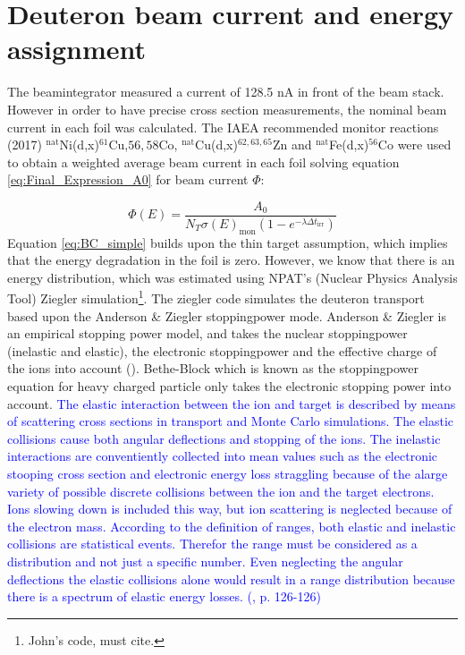 \section{Deuteron beam current and energy assignment} \label{sec:beamcurrent}
The beamintegrator measured a current of 128.5 nA in front of the beam stack. However in order to have precise cross section measurements, the nominal beam current in each foil was calculated. The IAEA recommended monitor reactions (2017) $^\text{nat}$Ni(d,x)$^{61}$Cu,$56,58$Co, $^\text{nat}$Cu(d,x)$^{62,63,65}$Zn and $^\text{nat}$Fe(d,x)$^{56}$Co \cite{Hermanne2018a} were used to obtain a weighted average beam current in each foil solving equation \ref{eq:Final_Expression_A0} for beam current $\Phi$:

\begin{equation} \label{eq:BC_simple}
    \Phi(E) = \frac{A_0}{N_T \sigma(E)_\text{mon}(1-e^{-\lambda \Delta t_\text{irr}})}
\end{equation}
\noindent 
Equation \ref{eq:BC_simple} builds upon the thin target assumption, which implies that the energy degradation in the foil is zero. However, we know that there is an energy distribution, which was estimated using NPAT's (Nuclear Physics Analysis Tool) Ziegler simulation\footnote{John's code, must cite.}. The ziegler code simulates the deuteron transport based upon the Anderson \& Ziegler stoppingpower mode\cite{Ziegler1999}. Anderson \& Ziegler is an empirical stopping power model, and takes the nuclear stoppingpower (inelastic and elastic), the electronic stoppingpower and the effective charge of the ions into account (\cite{Backlin1986, p. 96}). Bethe-Block which is known as the stoppingpower equation for heavy charged particle only takes the electronic stopping power into account. \textcolor{blue}{The elastic interaction between the ion and target is described by means of scattering cross sections in transport and Monte Carlo simulations. The elastic collisions cause both angular deflections and stopping of the ions. The inelastic interactions are conventiently collected into mean values such as the electronic stooping cross section and electronic energy loss straggling because of the alarge variety of possible discrete collisions between the ion and the target electrons. Ions slowing down is included this way, but ion scattering is neglected because of the electron mass. According to the definition of ranges, both elastic and inelastic collisions are statistical events. Therefor the range must be considered as a distribution and not just a specific number. Even neglecting the angular deflections the elastic collisions alone would result in a range distribution because there is a spectrum of elastic energy losses. (\cite{Backlin1986}, p. 126-126)} %
